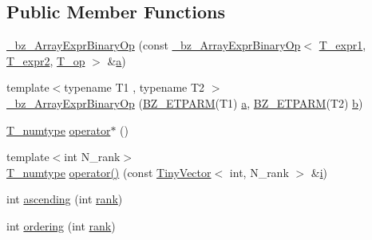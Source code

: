 \subsection*{Public Member Functions}
\begin{DoxyCompactItemize}
\item 
\hyperlink{class__bz__ArrayExprBinaryOp_ac01ce3626e8698866e4d0d6ad692940e}{\+\_\+bz\+\_\+\+Array\+Expr\+Binary\+Op} (const \hyperlink{class__bz__ArrayExprBinaryOp}{\+\_\+bz\+\_\+\+Array\+Expr\+Binary\+Op}$<$ \hyperlink{class__bz__ArrayExprBinaryOp_af88171beef51e2874b4508cab88b3990}{T\+\_\+expr1}, \hyperlink{class__bz__ArrayExprBinaryOp_a9fbe318600732f09ecc4faebffd47a51}{T\+\_\+expr2}, \hyperlink{class__bz__ArrayExprBinaryOp_a66e4dec28822c9524aadba055c096054}{T\+\_\+op} $>$ \&\hyperlink{gen__mat5files_8m_aae328bf20413f220e38aec4d95bfd6da}{a})
\item 
{\footnotesize template$<$typename T1 , typename T2 $>$ }\\\hyperlink{class__bz__ArrayExprBinaryOp_aac2e9896bf3187152e82cce4d0319e2f}{\+\_\+bz\+\_\+\+Array\+Expr\+Binary\+Op} (\hyperlink{tuning_8h_a92a6f3aa8f4cd5ac9b4239c449892bb7}{B\+Z\+\_\+\+E\+T\+P\+A\+R\+M}(T1) \hyperlink{gen__mat5files_8m_aae328bf20413f220e38aec4d95bfd6da}{a}, \hyperlink{tuning_8h_a92a6f3aa8f4cd5ac9b4239c449892bb7}{B\+Z\+\_\+\+E\+T\+P\+A\+R\+M}(T2) \hyperlink{gen__mat5files_8m_a7b38767b3b6a8dae167e5afa4fc340b0}{b})
\item 
\hyperlink{class__bz__ArrayExprBinaryOp_a7e6a612fc4afccbeaa3a2fdd32f8850e}{T\+\_\+numtype} \hyperlink{class__bz__ArrayExprBinaryOp_a70a93a68b78c737369a235534efb347b}{operator$\ast$} ()
\item 
{\footnotesize template$<$int N\+\_\+rank$>$ }\\\hyperlink{class__bz__ArrayExprBinaryOp_a7e6a612fc4afccbeaa3a2fdd32f8850e}{T\+\_\+numtype} \hyperlink{class__bz__ArrayExprBinaryOp_aae3a172a55a14a5d49fda7be9259b3b1}{operator()} (const \hyperlink{classTinyVector}{Tiny\+Vector}$<$ int, N\+\_\+rank $>$ \&\hyperlink{indexexpr_8h_aabd77643995707c185e95c8cb2782c81}{i})
\item 
int \hyperlink{class__bz__ArrayExprBinaryOp_a496ea6d6db01bec11d59f2f3cfca837b}{ascending} (int \hyperlink{class__bz__ArrayExprBinaryOp_a21b807f5de687f033836d8a82bae7f10}{rank})
\item 
int \hyperlink{class__bz__ArrayExprBinaryOp_a704fac493e0a0887723bdc51e444d7a9}{ordering} (int \hyperlink{class__bz__ArrayExprBinaryOp_a21b807f5de687f033836d8a82bae7f10}{rank})
\item 

\end{DoxyCompactItemize}
